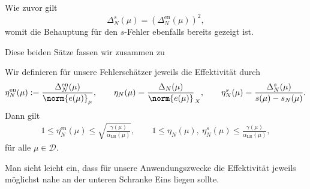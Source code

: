 \begin{Satz}
\begin{Beweis}
        Wie zuvor gilt
        \begin{equation}
            \Delta^s_N(\mu) = \left( \Delta^{\text{en}}_N(\mu) \right)^2,
        \end{equation}
        womit die Behauptung für den $s$-Fehler ebenfalls bereits gezeigt ist.
    \end{Beweis}
\end{Satz}

Diese beiden Sätze fassen wir zusammen zu

\begin{Korollar}
    \label{korollar:effektivitaeten}
    Wir definieren für unsere Fehlerschätzer jeweils die Effektivität durch
    \begin{equation}
        \eta^{\text{en}}_N(\mu) := \frac{\Delta^{\text{en}}_N(\mu)}{\norm{e(\mu)}_{\mu}}
        , \qquad
        \eta_N(\mu) = \frac{\Delta_N(\mu)}{\norm{e(\mu)}}_X
        , \qquad
        \eta^{s}_N(\mu) = \frac{\Delta^s_N(\mu)}{s(\mu) - s_N(\mu)}.
    \end{equation}
    Dann gilt
    \begin{align}
        1 \leq \eta^{\text{en}}_N(\mu) \leq \sqrt{\frac{\gamma(\mu)}{\alpha_{\text{LB}}(\mu)}}, \qquad
        1 \leq \eta_N(\mu),~\eta^{s}_N(\mu) \leq \frac{\gamma(\mu)}{\alpha_{\text{LB}}(\mu)},
    \end{align}
    für alle $\mu \in \mathcal D$.
\end{Korollar}
Man sieht leicht ein, dass für unsere Anwendungszwecke die Effektivität jeweils möglichst nahe an der unteren Schranke Eins liegen sollte.

